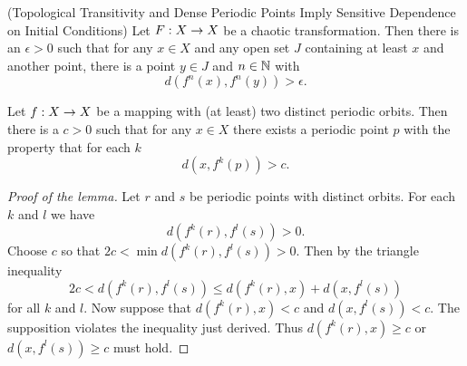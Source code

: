 \documentclass[12pt,draft,twoside]{book}
\begin{document}
\begin{theorem}
  (Topological Transitivity and Dense Periodic Points Imply Sensitive Dependence on Initial Conditions)
  Let $F: X\rightarrow X$ be a chaotic transformation. Then there is an $\epsilon > 0$ such that
  for any $x\in X$ and any open set $J$ containing at least $x$ and another point, there is
  a point $y\in J$ and $n\in \mathbb{N}$ with
  \begin{equation*}
    d(f^n(x),f^n(y)) > \epsilon.
  \end{equation*}
  \label{thm:banks}
\end{theorem}
\begin{lemma}
  Let $f: X\rightarrow X$ be a mapping with (at least) two distinct periodic orbits.
  Then there is a $c > 0$ such that for any $x\in X$ there exists a periodic
  point $p$ with the property that for each $k$
  \begin{equation*}
    d(x, f^k(p)) > c.
  \end{equation*}
\end{lemma}
\begin{proof}[Proof of the lemma]
  Let $r$ and $s$ be periodic points with distinct orbits. For each $k$ and $l$ we have
  \begin{equation*}
    d(f^k(r), f^l(s)) > 0.
  \end{equation*}
  Choose $c$ so that $2c < \min d(f^k(r),f^l(s)) > 0$. Then by the triangle inequality
  \begin{equation*}
    2c < d(f^k(r),f^l(s)) \leq d(f^k(r),x) + d(x,f^l(s))
  \end{equation*}
  for all $k$ and $l$. Now suppose that $d(f^k(r),x)<c$ and $d(x,f^l(s))<c$. The supposition
  violates the inequality just derived. Thus $d(f^k(r),x) \geq c$ or $d(x,f^l(s)) \geq c$ must hold.
\end{proof}
\end{document}
